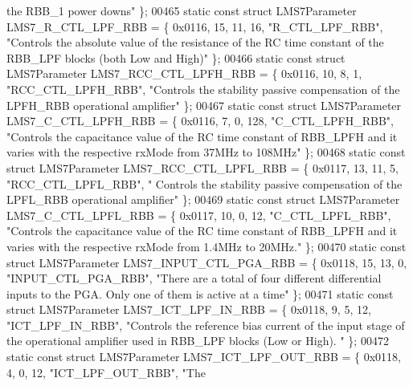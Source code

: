 \begin{DoxyCode}
{       the RBB\_1 power downs"} \};
00465 \textcolor{keyword}{static} \textcolor{keyword}{const} \textcolor{keyword}{struct }LMS7Parameter LMS7_R_CTL_LPF_RBB = \{ 0x0116, 15, 11, 16, \textcolor{stringliteral}{"R\_CTL\_LPF\_RBB"}, \textcolor{stringliteral}{"Controls the
       absolute value of the resistance of the RC time constant of the RBB\_LPF blocks (both Low and High)"} \};
00466 \textcolor{keyword}{static} \textcolor{keyword}{const} \textcolor{keyword}{struct }LMS7Parameter LMS7_RCC_CTL_LPFH_RBB = \{ 0x0116, 10, 8, 1, \textcolor{stringliteral}{"RCC\_CTL\_LPFH\_RBB"}, \textcolor{stringliteral}{"Controls
       the stability passive compensation of the LPFH\_RBB operational amplifier"} \};
00467 \textcolor{keyword}{static} \textcolor{keyword}{const} \textcolor{keyword}{struct }LMS7Parameter LMS7_C_CTL_LPFH_RBB = \{ 0x0116, 7, 0, 128, \textcolor{stringliteral}{"C\_CTL\_LPFH\_RBB"}, \textcolor{stringliteral}{"Controls
       the capacitance value of the RC time constant of RBB\_LPFH and it varies with the respective rxMode from 37MHz
       to 108MHz"} \};
00468 \textcolor{keyword}{static} \textcolor{keyword}{const} \textcolor{keyword}{struct }LMS7Parameter LMS7_RCC_CTL_LPFL_RBB = \{ 0x0117, 13, 11, 5, \textcolor{stringliteral}{"RCC\_CTL\_LPFL\_RBB"}, \textcolor{stringliteral}{"
      Controls the stability passive compensation of the LPFL\_RBB operational amplifier"} \};
00469 \textcolor{keyword}{static} \textcolor{keyword}{const} \textcolor{keyword}{struct }LMS7Parameter LMS7_C_CTL_LPFL_RBB = \{ 0x0117, 10, 0, 12, \textcolor{stringliteral}{"C\_CTL\_LPFL\_RBB"}, \textcolor{stringliteral}{"Controls
       the capacitance value of the RC time constant of RBB\_LPFH and it varies with the respective rxMode from 1.4MHz
       to 20MHz."} \};
00470 \textcolor{keyword}{static} \textcolor{keyword}{const} \textcolor{keyword}{struct }LMS7Parameter LMS7_INPUT_CTL_PGA_RBB = \{ 0x0118, 15, 13, 0, \textcolor{stringliteral}{"INPUT\_CTL\_PGA\_RBB"}, \textcolor{stringliteral}{"There
       are a total of four different differential inputs to the PGA. Only one of them is active at a time"} \};
00471 \textcolor{keyword}{static} \textcolor{keyword}{const} \textcolor{keyword}{struct }LMS7Parameter LMS7_ICT_LPF_IN_RBB = \{ 0x0118, 9, 5, 12, \textcolor{stringliteral}{"ICT\_LPF\_IN\_RBB"}, \textcolor{stringliteral}{"Controls the
       reference bias current of the input stage of the operational amplifier used in RBB\_LPF blocks (Low or
       High). "} \};
00472 \textcolor{keyword}{static} \textcolor{keyword}{const} \textcolor{keyword}{struct }LMS7Parameter LMS7_ICT_LPF_OUT_RBB = \{ 0x0118, 4, 0, 12, \textcolor{stringliteral}{"ICT\_LPF\_OUT\_RBB"}, \textcolor{stringliteral}{"The
}
\end{DoxyCode}
